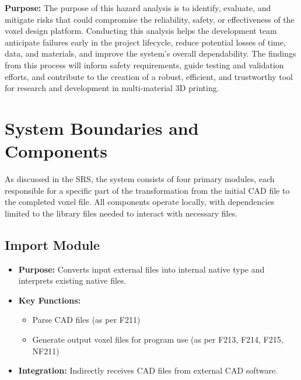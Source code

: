 \documentclass{article}
\begin{document}
\textbf{Purpose:} 
The purpose of this hazard analysis is to identify, evaluate, and mitigate risks that could compromise the reliability, safety, or effectiveness of the voxel design platform. Conducting this analysis helps the development team anticipate failures early in the project lifecycle, reduce potential losses of time, data, and materials, and improve the system’s overall dependability. The findings from this process will inform safety requirements, guide testing and validation efforts, and contribute to the creation of a robust, efficient, and trustworthy tool for research and development in multi-material 3D printing.

\section{System Boundaries and Components}

\iffalse
\wss{Dividing the system into components will help you brainstorm the hazards.
You shouldn't do a full design of the components, just get a feel for the major
ones.  For projects that involve hardware, the components will typically include
each individual piece of hardware.  If your software will have a database, or an
important library, these are also potential components.}
\fi

As discussed in the SRS, the system consists of four primary modules, each responsible
for a specific part of the transformation from the initial CAD file to the completed 
voxel file. All components operate locally, with dependencies limited to
the library files needed to interact with necessary files.

\subsection{Import Module}
\begin{itemize}
    \item \textbf{Purpose:} Converts input external files into internal native type and interprets existing native files.
    \item \textbf{Key Functions:} 
    \begin{itemize}
        \item Parse CAD files (as per F211)
        \item Generate output voxel files for program use (as per F213, F214, F215, NF211)
    \end{itemize}
    \item \textbf{Integration:} Indirectly receives CAD files from external CAD software.
\end{itemize}
\end{document}
